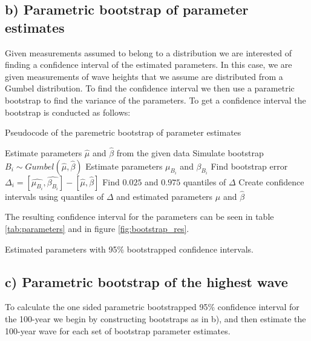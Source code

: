 \documentclass[a4paper]{article}
\begin{document}
\subsection*{b) Parametric bootstrap of parameter estimates}

Given measurements assumed to belong to a distribution we are interested of finding a confidence interval of the estimated parameters. In this case, we are given measurements of wave heights that we assume are distributed from a Gumbel distribution. To find the confidence interval we then use a parametric bootstrap to find the variance of the parameters. To get a confidence interval the bootstrap is conducted as follows:

\begin{algorithm}
    \caption{Pseudocode of the paremetric bootstrap of parameter estimates}
    \begin{algorithmic}
        \State Estimate parameters $\hat{\mu}$ and $\hat{\beta}$ from the given data
        \State Simulate bootstrap $B_i \sim Gumbel(\hat{\mu}, \hat{\beta})$
        \State Estimate parameters $\mu_{B_i}$ and $\beta_{B_i}$
        \State Find bootstrap error $\Delta_i = [\hat{\mu_{B_i}}, \hat{\beta_{B_i}}] - [\hat{\mu}, \hat{\beta}]$
        \EndFor
        \State Find $0.025$ and $0.975$ quantiles of $\Delta$
        \State Create confidence intervals using quantiles of $\Delta$ and estimated parameters $\hat{\mu}$ and $\hat{\beta}$
    \end{algorithmic}
\end{algorithm}

The resulting confidence interval for the parameters can be seen in table \ref{tab:parameters} and in figure \ref{fig:bootstrap_res}.

\begin{table}[H]
    \centering
    \caption{Estimated parameters with 95\% bootstrapped confidence intervals.}
    \label{tab:parameters}
    
\end{table}

\subsection*{c) Parametric bootstrap of the highest wave}

To calculate the one sided parametric bootstrapped 95\% confidence interval for the 100-year we begin by constructing bootstraps as in b), and then estimate the 100-year wave for each set of bootstrap parameter estimates.
\end{document}
